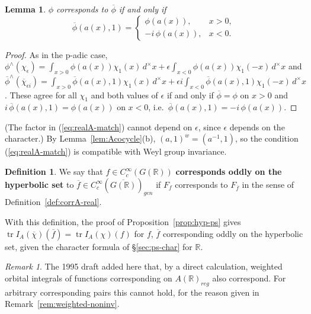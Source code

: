 \documentclass[12pt,letterpaper,openany]{book}
\theoremstyle{plain}
\newtheorem{lemma}[theorem]{Lemma}
\theoremstyle{definition}
\newtheorem{definition}[theorem]{Definition}
\theoremstyle{remark}
\newtheorem{remark}[theorem]{Remark}
\theoremstyle{remark}
\newcommand{\tr}{\operatorname{tr}}
\begin{document}
\begin{lemma}\label{lem:realA-match}
$\phi$ corresponds to $\overline{\phi}$ if and only if
\begin{equation}\label{eq:realA-match}
\overline{\phi}(a(x),1)=
\left\{
\begin{array}{ll}
\phi(a(x)), & x>0,\\
-i\,\phi(a(x)), & x<0.
\end{array}
\right.
\end{equation}
\end{lemma}

\begin{proof}
As in the p-adic case,
$\phi^\wedge(\chi_\epsilon)=\int_{x>0}\phi(a(x))\chi_1(x)\,d^\times x
+\epsilon\int_{x<0}\phi(a(x))\chi_1(-x)\,d^\times x$ and
$\overline{\phi}^\wedge(\overline{\chi}_{\epsilon i})
=\int_{x>0}\overline{\phi}(a(x),1)\chi_1(x)\,d^\times x
+\epsilon i\int_{x<0}\overline{\phi}(a(x),1)\chi_1(-x)\,d^\times x$.
These agree for all $\chi_1$ and both values of $\epsilon$ if and only if
$\overline{\phi}=\phi$ on $x>0$ and $i\,\overline{\phi}(a(x),1)=\phi(a(x))$
on $x<0$, i.e.\ $\overline{\phi}(a(x),1)=-i\,\phi(a(x))$.
\end{proof}

(The factor in (\ref{eq:realA-match}) cannot depend on $\epsilon$, since
$\epsilon$ depends on the character.) By Lemma~\ref{lem:Acocycle}(b), $(a,1)^w=(a^{-1},1)$, so the
condition (\ref{eq:realA-match}) is compatible with Weyl group
invariance.

\begin{definition} We say that
$f \in C_c^\infty(G({\mathbb R}))$ {\bf corresponds oddly on the
hyperbolic set} to
$\overline{f}\in C_c^\infty(\overline{G({\mathbb R})})_{gen}$
if $F_f$ corresponds to
$F_{\overline{f}}$
in the sense of Definition~\ref{def:corrA-real}.
\end{definition}

With this definition, the proof of Proposition~\ref{prop:hyp-ps} gives
$\tr I_A(\overline{\chi})(\overline{f})=\tr I_A(\chi)(f)$ for
$f$, $\overline{f}$ corresponding oddly on the hyperbolic set, given the
character formula of \S\ref{sec:ps-char} for ${\mathbb R}$.

\begin{remark}
The 1995 draft added here that, by a direct calculation, weighted
orbital integrals of functions corresponding on
$A({\mathbb{R}})_{reg}$ also correspond. For arbitrary corresponding
pairs this cannot hold, for the reason given in
Remark~\ref{rem:weighted-noninv}.
\end{remark}
\end{document}
